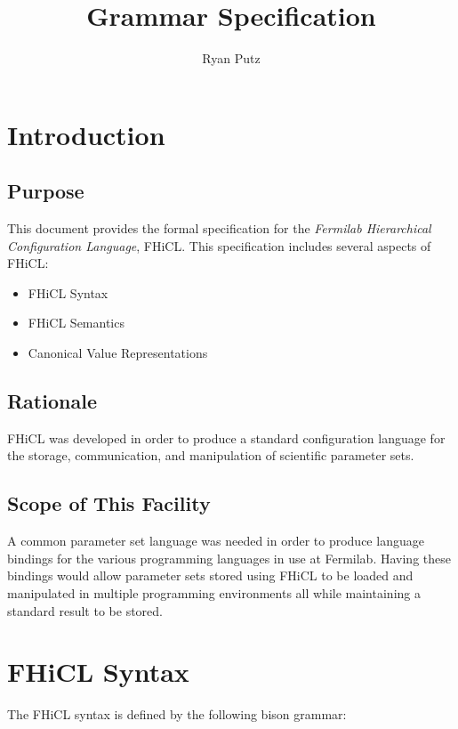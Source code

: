 \documentclass{memarticle}
\begin{document}
\topmatter
\setlength{\parindent}{0in}
\title{Grammar Specification}
\author{Ryan Putz}
\maketitle
\newpage

\tableofcontents
\newpage

\section{Introduction}
	\subsection{Purpose}
	{
		This document provides the formal specification
		for the \emph{Fermilab Hierarchical Configuration Language}, FHiCL.
		This specification includes several aspects of FHiCL:
		\begin{itemize}
			\item FHiCL Syntax
			\item FHiCL Semantics
			\item Canonical Value Representations
		\end{itemize}
	}

	\subsection{Rationale}
	{
		FHiCL was developed in order to produce
		a standard configuration language for the storage,
		communication, 
		and manipulation
		of scientific parameter sets.
	}
	
	\subsection{Scope of This Facility}
	{
		A common parameter set language was needed 
		in order to produce language bindings 
		for the various programming languages in use 
		at Fermilab.
		Having these bindings would allow parameter sets
		stored using FHiCL
		to be loaded 
		and manipulated in multiple programming environments
		all while maintaining a standard result to be stored.
	}
	\newpage	
\section{FHiCL Syntax}
	The FHiCL syntax is defined by the following bison grammar:
	\begin{verbatim}
		
	\end{verbatim}
\end{document}
